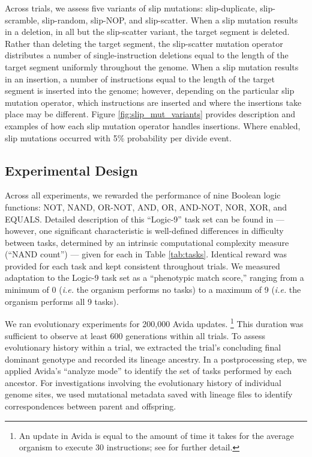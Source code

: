 Across trials, we assess five variants of slip mutations: slip-duplicate, slip-scramble, slip-random, slip-NOP, and slip-scatter.
When a slip mutation results in a deletion, in all but the slip-scatter variant, the target segment is deleted. Rather than deleting the target segment, the slip-scatter mutation operator distributes a number of single-instruction deletions equal to the length of the target segment uniformly throughout the genome.
When a slip mutation results in an insertion, a number of instructions equal to the length of the target segment is inserted into the genome; however, depending on the particular slip mutation operator, which instructions are inserted and where the insertions take place may be different.
Figure \ref{fig:slip_mut_variants} provides description and examples of how each slip mutation operator handles insertions.
Where enabled, slip mutations occurred with 5\% probability per divide event.

\subsection{Experimental Design}



Across all experiments, we rewarded the performance of nine Boolean logic functions: NOT, NAND, OR-NOT, AND, OR, AND-NOT, NOR, XOR, and EQUALS.
Detailed description of this ``Logic-9'' task set can be found in \citet{lenski2003evolutionary} ---
however, one significant characteristic is well-defined differences in difficulty between tasks, determined by an intrinsic computational complexity measure (``NAND count'') --- given for each in Table \ref{tab:tasks}.
Identical reward was provided for each task and kept consistent throughout trials.
We measured adaptation to the Logic-9 task set as a ``phenotypic match score,'' ranging from a minimum of 0 (\textit{i.e.} the organism performs no tasks) to a maximum of 9 (\textit{i.e.} the organism performs all 9 tasks).

We ran evolutionary experiments for 200,000 Avida updates.%
\footnote{An update in Avida is equal to the amount of time it takes for the average organism to execute 30 instructions; see \citep{Ofria:2009avida} for further detail.}
This duration was sufficient to observe at least 600 generations within all trials.
To assess evolutionary history within a trial, we extracted the trial's concluding final dominant genotype and recorded its lineage ancestry.
In a postprocessing step, we applied Avida's ``analyze mode'' to identify the set of tasks performed by each ancestor.
For investigations involving the evolutionary history of individual genome sites, we used mutational metadata saved with lineage files to identify correspondences between parent and offspring.

